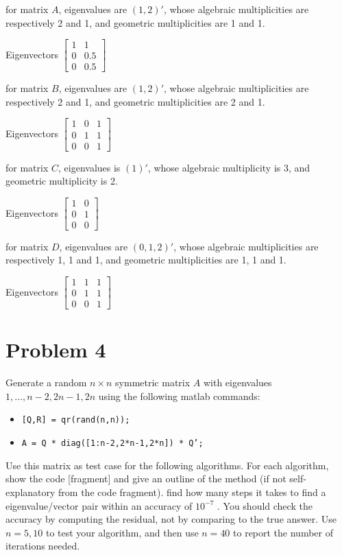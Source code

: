 \documentclass[12pt,oneside,a4paper]{article}
\newcommand{\problem}[1]
{
    \clearpage
    \section*{Problem {#1}}
}
\newcommand{\m}[1]{\texttt{{#1}}}
\begin{document}
for matrix $A$, eigenvalues are $(1, 2)'$, whose algebraic multiplicities are respectively 2 and 1, and geometric multiplicities are 1 and 1. 

Eigenvectors $\begin{bmatrix}
1&1\\
0&0.5\\
0&0.5
\end{bmatrix}$

for matrix $B$, eigenvalues are $(1, 2)'$, whose algebraic multiplicities are respectively 2 and 1, and geometric multiplicities are 2 and 1.

Eigenvectors $\begin{bmatrix}
1&0&1\\
0&1&1\\
0&0&1
\end{bmatrix}$

for matrix $C$, eigenvalues is $(1)'$, whose algebraic multiplicity is 3, and geometric multiplicity is 2.

Eigenvectors $\begin{bmatrix}
1&0\\
0&1\\
0&0
\end{bmatrix}$

for matrix $D$, eigenvalues are $(0, 1, 2)'$, whose algebraic multiplicities are respectively 1, 1 and 1, and geometric multiplicities are 1, 1 and 1.

Eigenvectors $\begin{bmatrix}
1&1&1\\
0&1&1\\
0&0&1
\end{bmatrix}$

\problem{4}
Generate a random $n \times n$ symmetric matrix $A$ with eigenvalues $1, \dots, n - 2, 2n - 1, 2n$ using the following matlab commands:
\begin{itemize}
    \item \m{[Q,R] = qr(rand(n,n));}
    \item \m{A = Q * diag([1:n-2,2*n-1,2*n]) * Q';}
\end{itemize}
Use this matrix as test case for the following algorithms. For each algorithm, show the code [fragment] and give an outline of the method (if not self-explanatory from the code fragment). find how many steps it takes to find a eigenvalue/vector pair within an accuracy of $10^{-7}$ . You should check the accuracy by computing the residual, not by comparing to the true answer. Use $n = 5, 10$ to test your algorithm, and then use $n = 40$ to report the number of iterations needed.
\end{document}
